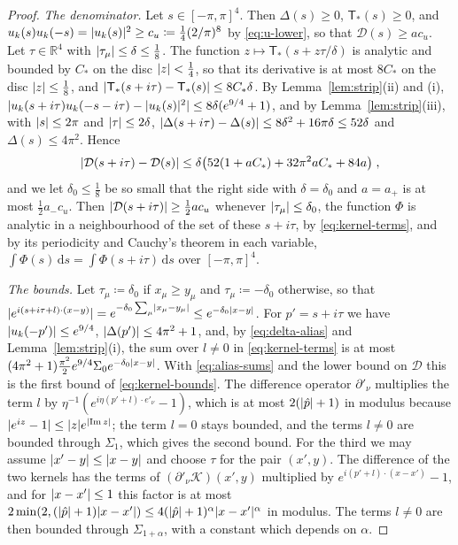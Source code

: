 \documentclass[11pt]{preprint}
\newcommand{\dd}{\mathrm{d}}
\DeclarePairedDelimiter{\abs}{\lvert}{\rvert}
\numberwithin{equation}{section}
\theoremstyle{definition}
\theoremstyle{remark}
\theoremstyle{plain}
\begin{document}
\begin{proof}
\emph{The denominator.} Let $s \in [-\pi, \pi]^4$. Then $\Delta(s) \geq 0$, $\mathsf T_*(s) \geq 0$, and $u_k(s)u_k(-s) = \abs{u_k(s)}^2 \geq c_u \coloneqq \frac14(2/\pi)^8$ by \eqref{eq:u-lower}, so that $\mathcal D(s) \geq ac_u$. Let $\tau \in \mathbb R^4$ with $\abs{\tau_\mu} \leq \delta \leq \frac18$. The function $z \mapsto \mathsf T_*(s + z\tau/\delta)$ is analytic and bounded by $C_*$ on the disc $\abs z < \frac14$, so that its derivative is at most $8C_*$ on the disc $\abs z \leq \frac18$, and $\abs{\mathsf T_*(s + i\tau) - \mathsf T_*(s)} \leq 8C_*\delta$. By Lemma~\ref{lem:strip}(ii) and (i), $\abs{u_k(s + i\tau)u_k(-s - i\tau) - \abs{u_k(s)}^2} \leq 8\delta(e^{9/4} + 1)$, and by Lemma~\ref{lem:strip}(iii), with $\abs s \leq 2\pi$ and $\abs\tau \leq 2\delta$, $\abs{\Delta(s + i\tau) - \Delta(s)} \leq 8\delta^2 + 16\pi\delta \leq 52\delta$ and $\Delta(s) \leq 4\pi^2$. Hence
\begin{equation}\label{eq:denominator-shift}
    \abs{\mathcal D(s + i\tau) - \mathcal D(s)} \leq \delta\bigl(52(1 + aC_*) + 32\pi^2aC_* + 84a\bigr)\;,
\end{equation}
and we let $\delta_0 \leq \frac18$ be so small that the right side with $\delta = \delta_0$ and $a = a_+$ is at most $\frac12a_-c_u$. Then $\abs{\mathcal D(s + i\tau)} \geq \frac12ac_u$ whenever $\abs{\tau_\mu} \leq \delta_0$, the function $\Phi$ is analytic in a neighbourhood of the set of these $s + i\tau$, by \eqref{eq:kernel-terms}, and by its periodicity and Cauchy's theorem in each variable, $\int\Phi(s)\,\dd s = \int\Phi(s + i\tau)\,\dd s$ over $[-\pi, \pi]^4$.

\emph{The bounds.} Let $\tau_\mu \coloneqq \delta_0$ if $x_\mu \geq y_\mu$ and $\tau_\mu \coloneqq -\delta_0$ otherwise, so that $\abs{e^{i(s + i\tau + l) \cdot (x - y)}} = e^{-\delta_0\sum_\mu\abs{x_\mu - y_\mu}} \leq e^{-\delta_0\abs{x - y}}$. For $p' = s + i\tau$ we have $\abs{u_k(-p')} \leq e^{9/4}$, $\abs{\Delta(p')} \leq 4\pi^2 + 1$, and, by \eqref{eq:delta-alias} and Lemma~\ref{lem:strip}(i), the sum over $l \neq 0$ in \eqref{eq:kernel-terms} is at most $(4\pi^2 + 1)\frac{\pi^2}{2}e^{9/4}\Sigma_0e^{-\delta_0\abs{x - y}}$. With \eqref{eq:alias-sums} and the lower bound on $\mathcal D$ this is the first bound of \eqref{eq:kernel-bounds}. The difference operator $\partial'_\nu$ multiplies the term $l$ by $\eta^{-1}(e^{i\eta(p' + l) \cdot e'_\nu} - 1)$, which is at most $2(\abs{\hat p} + 1)$ in modulus because $\abs{e^{iz} - 1} \leq \abs ze^{\abs{\operatorname{Im}z}}$; the term $l = 0$ stays bounded, and the terms $l \neq 0$ are bounded through $\Sigma_1$, which gives the second bound. For the third we may assume $\abs{x' - y} \leq \abs{x - y}$ and choose $\tau$ for the pair $(x', y)$. The difference of the two kernels has the terms of $(\partial'_\nu\mathcal K)(x', y)$ multiplied by $e^{i(p' + l) \cdot (x - x')} - 1$, and for $\abs{x - x'} \leq 1$ this factor is at most $2\min(2, (\abs{\hat p} + 1)\abs{x - x'}) \leq 4(\abs{\hat p} + 1)^\alpha\abs{x - x'}^\alpha$ in modulus. The terms $l \neq 0$ are then bounded through $\Sigma_{1+\alpha}$, with a constant which depends on $\alpha$.
\end{proof}
\end{document}
